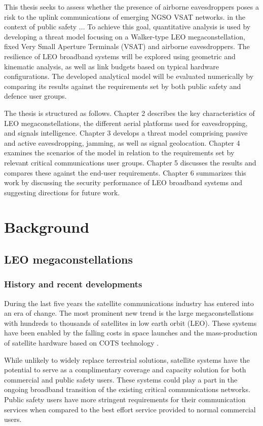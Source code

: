 \documentclass[english, 12pt, a4paper, elec, utf8, a-1b, online]{aaltothesis}
\begin{document}
This thesis seeks to assess whether the presence of airborne eavesdroppers poses a risk to the uplink communications of emerging NGSO VSAT networks. in the context of public safety ...
To achieve this goal, quantitative analysis is used by developing a threat model focusing on a Walker-type LEO megaconstellation, fixed Very Small Aperture Terminals (VSAT) and airborne eavesdroppers.
The resilience of LEO broadband systems will be explored using geometric and kinematic analysis, as well as link budgets based on typical hardware configurations.
The developed analytical model will be evaluated numerically by comparing its results against the requirements set by both public safety and defence user groups.

The thesis is structured as follows.
Chapter 2 describes the key characteristics of LEO megaconstellations, the different aerial platforms used for eavesdropping, and signals intelligence.
Chapter 3 develops a threat model comprising passive and active eavesdropping, jamming, as well as signal geolocation.
Chapter 4 examines the scenarios of the model in relation to the requirements set by relevant critical communications user groups.
Chapter 5 discusses the results and compares these against the end-user requirements.
Chapter 6 summarizes this work by discussing the security performance of LEO broadband systems and suggesting directions for future work.

\clearpage

\section{Background}

\subsection{LEO megaconstellations}
\subsubsection{History and recent developments}
During the last five years the satellite communications industry has entered into an era of change.
The most prominent new trend is the large megaconstellations with hundreds to thousands of satellites in low earth orbit (LEO).
These systems have been enabled by the falling costs in space launches and the mass-production of satellite hardware based on COTS technology \cite{portillo2019technical}.

While unlikely to widely replace terrestrial solutions, satellite systems have the potential to serve as a complimentary coverage and capacity solution for both commercial and public safety users.
These systems could play a part in the ongoing broadband transition of the existing critical communications networks.
Public safety users have more stringent requirements for their communication services when compared to the best effort service provided to normal commercial users.
\end{document}
